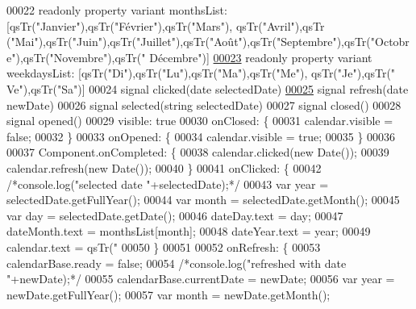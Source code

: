 \begin{DoxyCode}
00022     readonly \textcolor{keyword}{property} variant monthsList: [qsTr(\textcolor{stringliteral}{"Janvier"}),qsTr(\textcolor{stringliteral}{"Février"}),qsTr(\textcolor{stringliteral}{"Mars"}), qsTr(\textcolor{stringliteral}{"Avril"}),qsTr
      (\textcolor{stringliteral}{"Mai"}),qsTr(\textcolor{stringliteral}{"Juin"}),qsTr(\textcolor{stringliteral}{"Juillet"}),qsTr(\textcolor{stringliteral}{"Août"}),qsTr(\textcolor{stringliteral}{"Septembre"}),qsTr(\textcolor{stringliteral}{"Octobre"}),qsTr(\textcolor{stringliteral}{"Novembre"}),qsTr(\textcolor{stringliteral}{"
      Décembre"})]
\hypertarget{SH__CalendarDialog_8qml_source_l00023}{}\hyperlink{classSH__CalendarDialog_a86a4ef51cbfb7299a55bbddf2ae60f6a}{00023}     readonly \textcolor{keyword}{property} variant weekdaysList: [qsTr(\textcolor{stringliteral}{"Di"}),qsTr(\textcolor{stringliteral}{"Lu"}),qsTr(\textcolor{stringliteral}{"Ma"}),qsTr(\textcolor{stringliteral}{"Me"}), qsTr(\textcolor{stringliteral}{"Je"}),qsTr(\textcolor{stringliteral}{"
      Ve"}),qsTr(\textcolor{stringliteral}{"Sa"})]
00024     signal clicked(date selectedDate)
\hypertarget{SH__CalendarDialog_8qml_source_l00025}{}\hyperlink{classSH__CalendarDialog_a4ceac0c8c8f2b0d05060ddd66986b8e0}{00025}     signal refresh(date newDate)
00026     signal selected(\textcolor{keywordtype}{string} selectedDate)
00027     signal closed()
00028     signal opened()
00029     visible: true
00030     onClosed: \{
00031         calendar.visible = \textcolor{keyword}{false};
00032     \}
00033     onOpened: \{
00034         calendar.visible = \textcolor{keyword}{true};
00035     \}
00036 
00037     Component.onCompleted: \{
00038         calendar.clicked(\textcolor{keyword}{new} Date());
00039         calendar.refresh(\textcolor{keyword}{new} Date());
00040     \}
00041     onClicked: \{
00042         \textcolor{comment}{/*console.log("selected date "+selectedDate);*/}
00043         var year = selectedDate.getFullYear();
00044         var month = selectedDate.getMonth();
00045         var day = selectedDate.getDate();
00046         dateDay.text = day;
00047         dateMonth.text = monthsList[month];
00048         dateYear.text = year;
00049         calendar.text = qsTr(\textcolor{stringliteral}{"%
00050     \}
00051 
00052     onRefresh: \{
00053         calendarBase.ready = \textcolor{keyword}{false};
00054         \textcolor{comment}{/*console.log("refreshed with date "+newDate);*/}
00055         calendarBase.currentDate = newDate;
00056         var year = newDate.getFullYear();
00057         var month = newDate.getMonth();
}
\end{DoxyCode}
